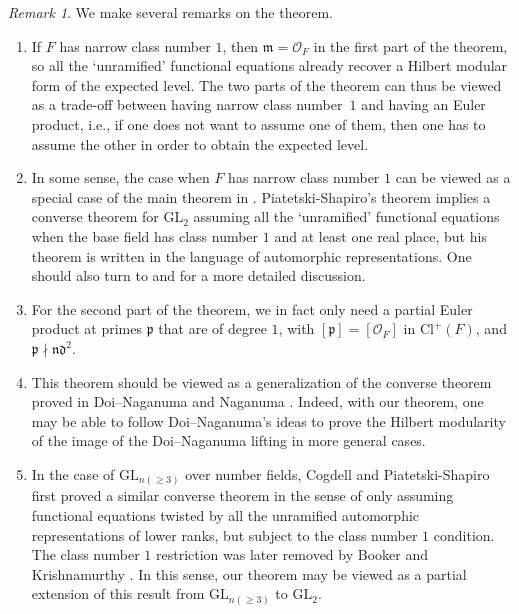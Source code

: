\documentclass[11pt]{amsart}
\theoremstyle{remark}
\newtheorem*{rmk}{Remark}
\newcommand\fr[1]{\mathfrak{#1}}
\newcommand{\clo}{\mathcal{O}}
\newcommand{\GL}{\mathrm{GL}}
\newcommand{\Cl}{\mathrm{Cl}}
\begin{document}
\begin{rmk}
We make several remarks on the theorem.
\begin{enumerate}[label=(\roman*)]
    \item If $F$ has narrow class number $1$, then $\fr{m}=\clo_F$ in the first part of the theorem, so all the `unramified' functional equations already recover a Hilbert modular form of the expected level. The two parts of the theorem can thus be viewed as a trade-off between having narrow class number~$1$ and having an Euler product, i.e., if one does not want to assume one of them, then one has to assume the other in order to obtain the expected level.
    \item In some sense, the case when $F$ has narrow class number $1$ can be viewed as a special case of the main theorem in \cite{p-s}. Piatetski-Shapiro's theorem implies a converse theorem for $\GL_2$ assuming all the `unramified' functional equations when the base field has class number $1$ and at least one real place, but his theorem is written in the language of automorphic representations. One should also turn to \cite[(iii),~p.671]{bookerkrish-strengthen} and \cite[Lemma~2.2]{bookerkrish-refine} for a more detailed discussion.
    \item For the second part of the theorem, we in fact only need a partial Euler product at primes $\fr{p}$ that are of degree $1$, with $[\fr{p}]=[\clo_F]$ in $\Cl^+(F)$, and $\fr{p}\nmid\fr{n}\fr{d}^2$.
    \item This theorem should be viewed as a generalization of the converse theorem proved in Doi--Naganuma \cite{doinaganuma} and Naganuma \cite{naganuma}. Indeed, with our theorem, one may be able to follow Doi--Naganuma's ideas to prove the Hilbert modularity of the image of the Doi--Naganuma lifting in more general cases.
    \item In the case of $\GL_{n(\geq3)}$ over number fields, Cogdell and Piatetski-Shapiro \cite[Theorem~3]{cogdellpsi} first proved a similar converse theorem in the sense of only assuming functional equations twisted by all the unramified automorphic representations of lower ranks, but subject to the class number $1$ condition. The class number $1$ restriction was later removed by Booker and Krishnamurthy \cite[Theorem~1.1]{bookerkrish-gln}. In this sense, our theorem may be viewed as a partial extension of this result from $\GL_{n(\geq3)}$ to $\GL_2$.
\end{enumerate}
\end{rmk}
\end{document}
